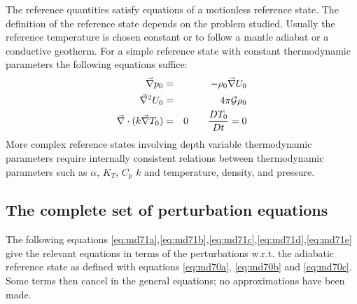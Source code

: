 \vspace{.5cm}


\vspace{0.5cm}

The reference quantities satisfy equations of a motionless reference state. The definition
of the reference state depends on the problem studied. Usually the reference temperature
is chosen constant or to follow a mantle adiabat or a conductive geotherm. For a simple
reference state with constant thermodynamic parameters the following equations suffice:
\begin{eqnarray}
\vec\nabla p_0 &=& -\rho_0 \vec\nabla U_0  \label{eq:md70a}\\
\vec\nabla^2 U_0 &=& 4\pi {\cal G} \rho_0  \label{eq:md70b}\\
\vec\nabla \cdot ( k \vec\nabla T_0) &=& 0 \qquad \frac{DT_0}{Dt}=0 \label{eq:md70c}
\end{eqnarray}
More complex reference states involving depth variable thermodynamic parameters
require internally consistent relations between thermodynamic parameters such as
$\alpha$, $K_T$, $C_p$ $k$ and temperature, density, and pressure.

\vspace{0.5cm}




\subsection{The complete set of perturbation equations}

The following equations \eqref{eq:md71a},\eqref{eq:md71b},\eqref{eq:md71c},\eqref{eq:md71d},\eqref{eq:md71e} 
give the relevant equations in terms of the perturbations w.r.t. the
adiabatic reference state as defined with equations 
\eqref{eq:md70a}, \eqref{eq:md70b} and \eqref{eq:md70c}. 
Some terms then cancel in the general equations; no approximations have been made. 


